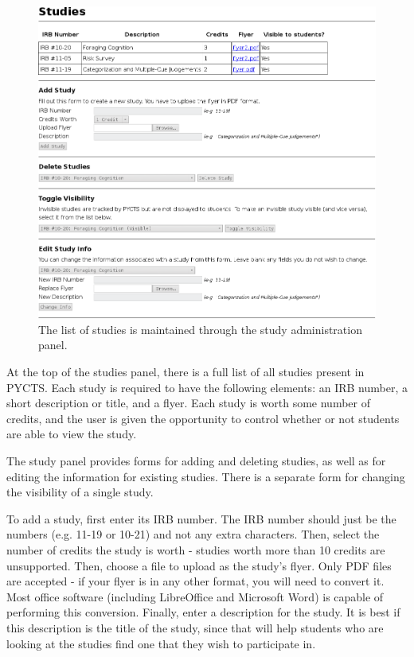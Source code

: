 \documentclass[letterpaper,titlepage]{article}
\begin{document}
\begin{figure}[H]
\includegraphics[width=\textwidth]{images/prof_studies.png}
\caption{The list of studies is maintained through the study administration panel.}
\label{prof_studies}
\end{figure}

At the top of the studies panel, there is a full list of all studies present in PYCTS. Each study is required to have the following elements: an IRB number, a short description or title, and a flyer. Each study is worth some number of credits, and the user is given the opportunity to control whether or not students are able to view the study.

The study panel provides forms for adding and deleting studies, as well as for editing the information for existing studies. There is a separate form for changing the visibility of a single study.

To add a study, first enter its IRB number. The IRB number should just be the numbers (e.g. 11-19 or 10-21) and not any extra characters. Then, select the number of credits the study is worth - studies worth more than 10 credits are unsupported. Then, choose a file to upload as the study's flyer. Only PDF files are accepted - if your flyer is in any other format, you will need to convert it. Most office software (including LibreOffice and Microsoft Word) is capable of performing this conversion. Finally, enter a description for the study. It is best if this description is the title of the study, since that will help students who are looking at the studies find one that they wish to participate in.
\end{document}
